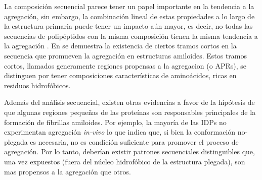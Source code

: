 La composición secuencial parece tener un papel importante en la tendencia a la agregación, sin embargo, la combinación lineal de estas propiedades a lo largo de la estructura
primaria puede tener un impacto aún mayor, es decir, no todas las secuencias de polipéptidos con la misma composición tienen la misma tendencia a la agregación \cite{de2004sequence}.
En \cite{ventura2004short} se demuestra la existencia de ciertos tramos cortos en la secuencia que promueven la agregación en estructuras amiloides.
Estos tramos cortos, llamados generamente regiones propensas a la agregacion (o APRs), se distinguen por tener composiciones características de aminoácidos, ricas en residuos hidrofóbicos.

Además del análisis secuencial, existen otras evidencias a favor de la hipótesis de que algunas regiones pequeñas de las proteínas son responsables principales de la formación de fibrillas amiloides. 
Por ejemplo, la mayoría de las IDPs no experimentan agregación \textit{in-vivo} \cite{linding2004comparative} lo que indica que, si bien la conformación no-plegada es necesaria, no es condición suficiente 
para promover el proceso de agregación.
Por lo tanto, deberían existir patrones secuenciales distinguibles que, una vez expuestos (fuera del núcleo hidrofóbico de la estructura plegada), son mas propensos a la agregación que otros.  



% 
% 





